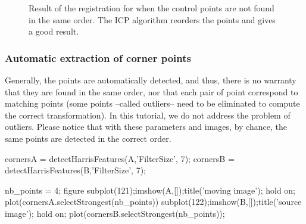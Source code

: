 \begin{figure}[htbp]
\centering
 \hfill
 
 \caption{Result of the registration for when the control points are not found in the same order. The ICP algorithm reorders the points and gives a good result.}
 \label{fig:registration:matlab:icp}
\end{figure}

\subsubsection{Automatic extraction of corner points}
Generally, the points are automatically detected, and thus, there is no warranty that they are found in the same order, nor that each pair of point correspond to matching points (some points --called outliers-- need to be eliminated to compute the correct transformation). In this tutorial, we do not address the problem of outliers. Please notice that with these parameters and images, by chance, the same points are detected in the correct order.

\begin{matlab}
cornersA = detectHarrisFeatures(A,'FilterSize', 7);
cornersB = detectHarrisFeatures(B,'FilterSize', 7);

nb_points = 4;
figure
subplot(121);imshow(A,[]);title('moving image');
hold on; plot(cornersA.selectStrongest(nb_points))
subplot(122);imshow(B,[]);title('source image');
hold on;
plot(cornersB.selectStrongest(nb_points));
\end{matlab}

